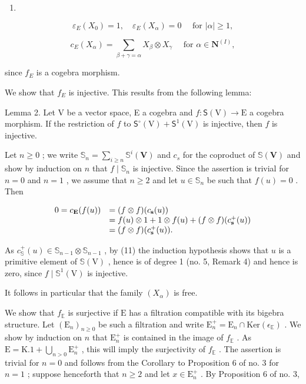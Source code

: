 \begin{enumerate}
\def\labelenumi{(\arabic{enumi})}
\setcounter{enumi}{16}
\tightlist
\item
\end{enumerate}

\[
\varepsilon_ {E} (X _ {0}) = 1, \quad \varepsilon_ {E} (X _ {\alpha}) = 0 \quad \text { for } | \alpha | \geqslant 1,\tag{18}
\]

\[
c _ {E} (X _ {\alpha}) = \sum_ {\beta + \gamma = \alpha} X _ {\beta} \otimes X _ {\gamma} \quad \text { for } \alpha \in \mathbf {N} ^ {(I)},
\]

since \(f_{E}\) is a cogebra morphism.

We show that \(f_{E}\) is injective. This results from the following lemma:

Lemma 2. Let V be a vector space, E a cogebra and \(f\colon\mathsf{S}(\mathrm{V})\to\mathrm{E}\) a cogebra morphism. If the restriction of \(f\) to \(\mathsf{S}^{\circ}(\mathrm{V})+\mathsf{S}^{1}(\mathrm{V})\) is injective, then \(f\) is injective.

Let \(n \geqslant 0\) ; we write \(\mathbb{S}_n = \sum_{i \geqslant n} \mathbb{S}^i(\mathbf{V})\) and \(c_s\) for the coproduct of \(\mathbb{S}(\mathbf{V})\) and show by induction on \(n\) that \(f \mid \mathbb{S}_n\) is injective. Since the assertion is trivial for \(n = 0\) and \(n = 1\) , we assume that \(n \geqslant 2\) and let \(u \in \mathbb{S}_n\) be such that \(f(u) = 0\) . Then

\[
\begin{array}{r l} {0 = c _ {\mathbf {E}} (f (u))} & {= (f \otimes f) (c _ {\mathbf {s}} (u))} \\ & {= f (u) \otimes 1 + 1 \otimes f (u) + (f \otimes f) (c _ {\mathbf {s}} ^ {+} (u))} \\ & {= (f \otimes f) (c _ {\mathbf {s}} ^ {+} (u)).} \end{array}
\]

As \(c_{\mathbb{S}}^{+}(u) \in \mathbb{S}_{n-1} \otimes \mathbb{S}_{n-1}\) , by (11) the induction hypothesis shows that \(u\) is a primitive element of \(\mathbb{S}(\mathrm{V})\) , hence is of degree 1 (no. 5, Remark 4) and hence is zero, since \(f \mid \mathbb{S}^1(\mathrm{V})\) is injective.

It follows in particular that the family \((X_{\alpha})\) is free.

We show that \(f_{\mathbb{E}}\) is surjective if \(\mathrm{E}\) has a filtration compatible with its bigebra structure. Let \((\mathrm{E}_n)_{n\geqslant 0}\) be such a filtration and write \(\mathrm{E}_n^+ = \mathrm{E}_n\cap \mathrm{Ker}(\epsilon_{\mathbb{E}})\) . We show by induction on \(n\) that \(\mathrm{E}_n^+\) is contained in the image of \(f_{\mathbb{E}}\) . As \(\mathrm{E} = \mathrm{K}.1 + \bigcup_{n > 0}\mathrm{E}_n^+\) , this will imply the surjectivity of \(f_{\mathbb{E}}\) . The assertion is trivial for \(n = 0\) and follows from the Corollary to Proposition 6 of no. 3 for \(n = 1\) ; suppose henceforth that \(n\geqslant 2\) and let \(x\in \mathrm{E}_n^+\) . By Proposition 6 of no. 3,

